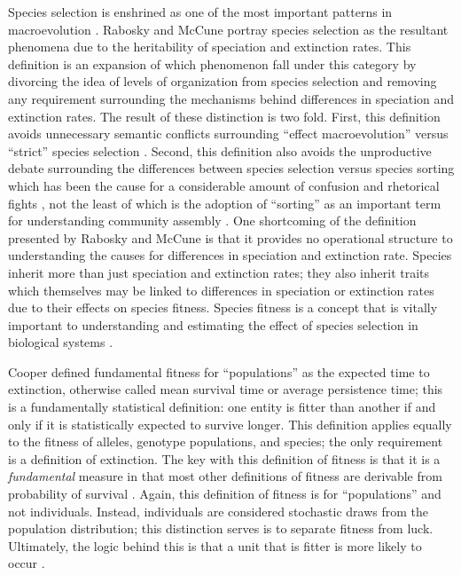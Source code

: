 Species selection is enshrined as one of the most important patterns in macroevolution \citep{Stanley1975,Stanley1979,Vrba1986,Jablonski2008a,Rabosky2010b,Simpson2016a,Pennell2014}. Rabosky and McCune \citep{Rabosky2010b} portray species selection as the resultant phenomena due to the heritability of speciation and extinction rates. This definition is an expansion of which phenomenon fall under this category by divorcing the idea of levels of organization from species selection and removing any requirement surrounding the mechanisms behind differences in speciation and extinction rates. The result of these distinction is two fold. First, this definition avoids unnecessary semantic conflicts surrounding ``effect macroevolution'' versus ``strict'' species selection \citep{Jablonski2007,Jablonski2008a,Vrba1984}. Second, this definition also avoids the unproductive debate surrounding the differences between species selection versus species sorting which has been the cause for a considerable amount of confusion and rhetorical fights \citep{Vrba1984a,Vrba1986,Lloyd1993,Pennell2014}, not the least of which is the adoption of ``sorting'' as an important term for understanding community assembly \citep{Urban2008,Loeuille2008,Holt2006,Cottenie2005,Soininen2014,VanderGucht2007,Shipley2006}. One shortcoming of the definition presented by Rabosky and McCune \citep{Rabosky2010b} is that it provides no operational structure to understanding the causes for differences in speciation and extinction rate. Species inherit more than just speciation and extinction rates; they also inherit traits which themselves may be linked to differences in speciation or extinction rates due to their effects on species fitness. Species fitness is a concept that is vitally important to understanding and estimating the effect of species selection in biological systems \citep{Cooper1984,Palmer2012}. 

Cooper \citep{Cooper1984} defined fundamental fitness for ``populations'' as the expected time to extinction, otherwise called mean survival time or average persistence time; this is a fundamentally statistical definition: one entity is fitter than another if and only if it is statistically expected to survive longer. This definition applies equally to the fitness of alleles, genotype populations, and species; the only requirement is a  definition of extinction. The key with this definition of fitness is that it is a \textit{fundamental} measure in that most other definitions of fitness are derivable from probability of survival \citep{Cooper1984}. Again, this definition of fitness is for ``populations'' and not individuals. Instead, individuals are considered stochastic draws from the population distribution; this distinction serves is to separate fitness from luck. Ultimately, the logic behind this is that a unit that is fitter is more likely to occur \citep{Cooper1984}.

